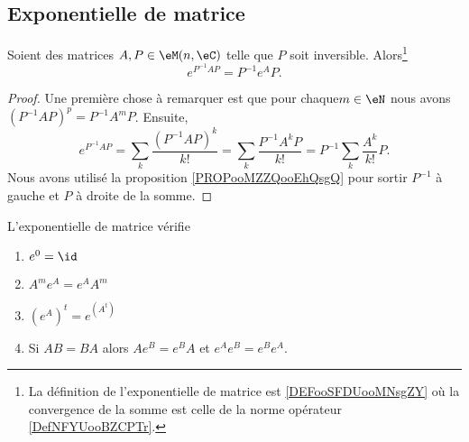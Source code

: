 \subsection{Exponentielle de matrice}
\label{SECooBYQBooZifJsg}

\begin{proposition}
    Soient des matrices \( A,P\in \eM(n,\eC)\) telle que \( P\) soit inversible. Alors\footnote{La définition de l'exponentielle de matrice est \ref{DEFooSFDUooMNsgZY} où la convergence de la somme est celle de la norme opérateur \ref{DefNFYUooBZCPTr}.}
    \begin{equation}
        e^{P^{-1}AP}=P^{-1} e^{A}P.
    \end{equation}
\end{proposition}

\begin{proof}
    Une première chose à remarquer est que pour chaque\( m\in \eN\) nous avons \( (P^{-1}AP)^p=P^{-1} A^mP\). Ensuite,
    \begin{equation}
        e^{P^{-1}AP}=\sum_k\frac{(P^{-1}AP)^k}{ k! }=\sum_k\frac{ P^{-1}A^kP }{ k! }=P^{-1}\sum_k\frac{ A^k }{ k! }P.
    \end{equation}
    Nous avons utilisé la proposition \ref{PROPooMZZQooEhQsgQ} pour sortir \( P^{-1}\) à gauche et \( P\) à droite de la somme.
\end{proof}

\begin{proposition}       \label{PROPooFLHPooRhLiZE}
    L'exponentielle de matrice vérifie
    \begin{enumerate}
        \item       \label{ITEMooCVALooEfLQCyI}
            \( e^0=\id\)
        \item       \label{ITEMooNGPWooIyPEQt}
            \( A^m e^{A}= e^{A}A^m\)
        \item       \label{ITEMooEOSMooQWjcjA}
            \( ( e^{A})^t= e^{(A^t)}\)
        \item       \label{ITEMooROPJooMarenu}
            Si \( AB=BA\) alors \( A e^{B}= e^{B}A\) et \(  e^{A} e^{B}= e^{B} e^{A}\).
    \end{enumerate}
\end{proposition}

